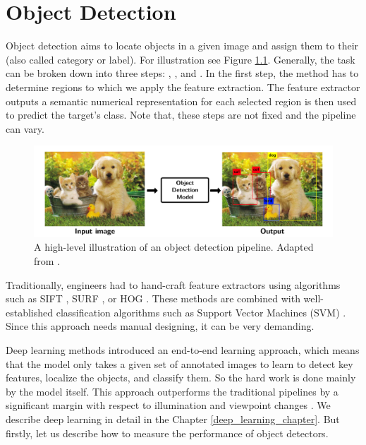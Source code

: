 \chapter{Object Detection}
Object detection aims to locate objects in a given image and assign them to their  (also called category or label). For illustration see Figure \ref{fig:od}. Generally, the task can be broken down into three steps: , , and . In the first step, the method has to determine regions to which we apply the feature extraction. The feature extractor outputs a semantic numerical representation for each selected region is then used to predict the target's class. Note that, these steps are not fixed and the pipeline can vary.

\begin{figure}[h]
    \centering
    \includegraphics[width=0.9\linewidth]{Sources/Figures/objectdetection.png}
    \caption{A high-level illustration of an object detection pipeline. Adapted from \cite{objectdetectionfigure}.}
    \label{fig:od}
\end{figure}

Traditionally, engineers had to hand-craft feature extractors using algorithms such as SIFT \cite{sift}, SURF \cite{surf}, or HOG \cite{hog}. These methods are combined with well-established classification algorithms such as Support Vector Machines (SVM) \cite{svm}. Since this approach needs manual designing, it can be very demanding.

Deep learning methods introduced an end-to-end learning approach, which means that the model only takes a given set of annotated images to learn to detect key features, localize the objects, and classify them. So the hard work is done mainly by the model itself. This approach outperforms the traditional pipelines by a significant margin with respect to illumination and viewpoint changes \cite{outperforming}. We describe deep learning in detail in the Chapter \ref{deep_learning_chapter}. But firstly, let us describe how to measure the performance of object detectors.

